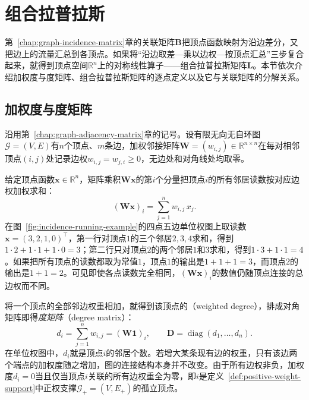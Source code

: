 \section{组合拉普拉斯}
\label{sec:graph-laplacian}

第~\ref{chap:graph-incidence-matrix}章的关联矩阵$\bm B$把顶点函数映射为沿边差分，又把边上的流量汇总到各顶点。如果将“沿边取差—乘以边权—按顶点汇总”三步复合起来，就得到顶点空间$\mathbb R^n$上的对称线性算子——组合拉普拉斯矩阵$\bm L$。本节依次介绍加权度与度矩阵、组合拉普拉斯矩阵的逐点定义以及它与关联矩阵的分解关系。

\subsection{加权度与度矩阵}
\label{sec:graph-weighted-adjacency}

沿用第~\ref{chap:graph-adjacency-matrix}章的记号。设有限无向无自环图$\mathcal G=(V,E)$有$n$个顶点、$m$条边，加权邻接矩阵$\bm W=(w_{i,j})\in\mathbb R^{n\times n}$在每对相邻顶点$(i,j)$处记录边权$w_{i,j}=w_{j,i}\geq 0$，无边处和对角线处均取零。

给定顶点函数$\bm x\in\mathbb R^n$，矩阵乘积$\bm W\bm x$的第$i$个分量把顶点$i$的所有邻居读数按对应边权加权求和：
\begin{equation}
  (\bm W\bm x)_i=\sum_{j=1}^n w_{i,j}\,x_j.
  \label{eq:graph-weighted-neighbor-sum}
\end{equation}
在图~\ref{fig:incidence-running-example}的四点五边单位权图上取读数$\bm x=(3,2,1,0)^\top$，第一行对顶点$1$的三个邻居$2,3,4$求和，得到$1\cdot2+1\cdot1+1\cdot0=3$；第二行只对顶点$2$的两个邻居$1$和$3$求和，得到$1\cdot3+1\cdot1=4$。如果把所有顶点的读数都取为常值$1$，顶点$1$的输出是$1+1+1=3$，而顶点$2$的输出是$1+1=2$。可见即使各点读数完全相同，$(\bm W\bm x)_i$的数值仍随顶点连接的总边权而不同。

将一个顶点的全部邻边权重相加，就得到该顶点的（weighted degree），排成对角矩阵即得\emph{度矩阵}（degree matrix）：
\begin{equation}
  d_i=\sum_{j=1}^n w_{i,j}=(\bm W\bm 1)_i,\qquad
  \bm D=\operatorname{diag}(d_1,\ldots,d_n).
  \label{eq:graph-laplacian-weighted-degree}
\end{equation}
在单位权图中，$d_i$就是顶点$i$的邻居个数。若增大某条现有边的权重，只有该边两个端点的加权度随之增加，图的连接结构本身并不改变。由于所有边权非负，加权度$d_i=0$当且仅当顶点$i$关联的所有边权重全为零，即$i$是定义~\ref{def:positive-weight-support}中正权支撑$\mathcal G_+=(V,E_+)$的孤立顶点。

